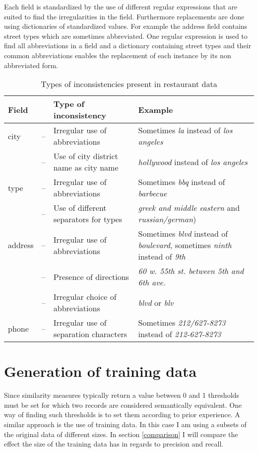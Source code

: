 \documentclass[conference]{IEEEtran}
\begin{document}
Each field is standardized by the use of different regular expressions that are suited to find the irregularities in the field. Furthermore replacements are done using dictionaries of standardized values. For example the address field contains street types which are sometimes abbreviated. One regular expression is used to find all abbreviations in a field and a dictionary containing street types and their common abbreviations enables the replacement of each instance by its non abbreviated form.
\begin{table}
	\begin{tabularx}{\columnwidth}{lr@{ }XX}
	\toprule
	Field &&Type of inconsistency & Example \\
	\midrule
	city & --&Irregular use of abbreviations &Sometimes \emph{la} instead of \emph{los angeles}\\\rule[.2ex]{0pt}{2.5ex}
		 & --&Use of city district name as city name& \emph{hollywood} instead of \emph{los angeles}\\
	\midrule
	type & --& Irregular use of abbreviations  &Sometimes \emph{bbq} instead of \emph{barbecue}\\\rule[.2ex]{0pt}{2.5ex}
		 & --& Use of different separators for types & \emph{greek and middle eastern} and \emph{russian/german})\\
	\midrule
	address & --&Irregular use of abbreviations &Sometimes \emph{blvd} instead of \emph{boulevard}, sometimes \emph{ninth} instead of \emph{9th}\\\rule[.2ex]{0pt}{2.5ex}
	 & --&Presence of directions & \emph{60 w. 55th st. between 5th and 6th ave.}\\\rule[.2ex]{0pt}{2.5ex}
	 & --& Irregular choice of abbreviations & \emph{blvd} or \emph{blv}\\
	\midrule
	phone & --& Irregular use of separation characters  & Sometimes \emph{212/627-8273} instead of \emph{212-627-8273}\\
	\bottomrule
	\end{tabularx}
	\caption{Types of inconsistencies present in restaurant data}\label{rec_faults}
\end{table}

\section{Generation of training data}\label{train_gen}
Since similarity measures typically return a value between 0 and 1 thresholds must be set for which two records are considered semantically equivalent. One way of finding such thresholds is to set them according to prior experience. A similar approach is the use of training data. In this case I am using a subsets of the original data of different sizes. In section \ref{comparison} I will compare the effect the size of the training data has in regards to precision and recall. 
\end{document}
